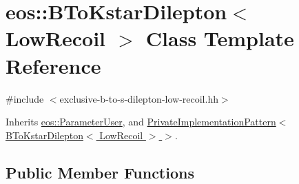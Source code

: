 \hypertarget{classeos_1_1BToKstarDilepton_3_01LowRecoil_01_4}{
\section{eos::BToKstarDilepton$<$ LowRecoil $>$ Class Template Reference}
\label{classeos_1_1BToKstarDilepton_3_01LowRecoil_01_4}
}


{\ttfamily \#include $<$exclusive-\/b-\/to-\/s-\/dilepton-\/low-\/recoil.hh$>$}

Inherits \hyperlink{classeos_1_1ParameterUser}{eos::ParameterUser}, and \hyperlink{classeos_1_1PrivateImplementationPattern}{PrivateImplementationPattern$<$ BToKstarDilepton$<$ LowRecoil $>$ $>$}.\subsection*{Public Member Functions}
